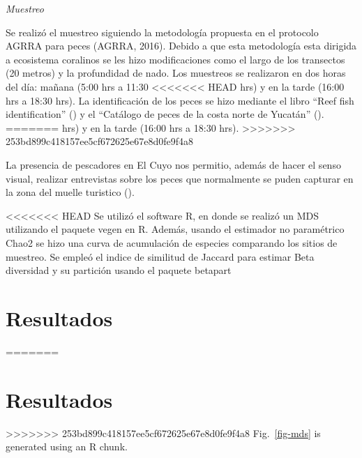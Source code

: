 \documentclass[
  authoryear,
  preprint,
  3p]{elsarticle}
\begin{document}
\emph{Muestreo}

Se realizó el muestreo siguiendo la metodología propuesta en el
protocolo AGRRA para peces (AGRRA, 2016). Debido a que esta metodología
esta dirigida a ecosistema coralinos se les hizo modificaciones como el
largo de los transectos (20 metros) y la profundidad de nado. Los
muestreos se realizaron en dos horas del día: mañana (5:00 hrs a 11:30
<<<<<<< HEAD
hrs) y en la tarde (16:00 hrs a 18:30 hrs). La identificación de los
peces se hizo mediante el libro ``Reef fish identification'' () y el
``Catálogo de peces de la costa norte de Yucatán'' ().
=======
hrs) y en la tarde (16:00 hrs a 18:30 hrs).
>>>>>>> 253bd899c418157ee5cf672625e67e8d0fe9f4a8

La presencia de pescadores en El Cuyo nos permitio, además de hacer el
senso visual, realizar entrevistas sobre los peces que normalmente se
puden capturar en la zona del muelle turistico ().

<<<<<<< HEAD
Se utilizó el software R, en donde se realizó un MDS utilizando el
paquete vegen\citep{vegan} en R. Además, usando el estimador no
paramétrico Chao2 \citep{chao2014a} se hizo una curva de acumulación de
especies comparando los sitios de muestreo. Se empleó el indice de
similitud de Jaccard para estimar Beta diversidad y su partición
\citep{baselga2009} usando el paquete betapart \citep{betapart}

\section{Resultados}\label{resultados}

=======
\hypertarget{resultados}{%
\section{Resultados}\label{resultados}}

>>>>>>> 253bd899c418157ee5cf672625e67e8d0fe9f4a8
Fig.~\ref{fig-mds} is generated using an R chunk.
\end{document}
